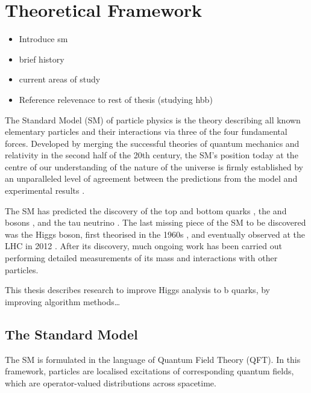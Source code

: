 \chapter{Theoretical Framework}\label{chap:theory}

\begin{itemize}
  \item Introduce sm
  \item brief history
  \item current areas of study
  \item Reference relevenace to rest of thesis (studying hbb)
\end{itemize}

The Standard Model (SM) of particle physics is the theory describing all known elementary particles and their interactions via three of the four fundamental forces.
Developed by merging the successful theories of quantum mechanics and relativity in the second half of the 20th century, the SM's position today at the centre of our understanding of the nature of the universe is firmly established by an unparalleled level of agreement between the predictions from the model and experimental results \cite{morel2020determination,sailer2022measurement}.

The SM has predicted the discovery of the top and bottom quarks \cite{CDF:1995wbb,D0:1995jca,Herb:1977ek}, the \Wboson and \Zboson bosons \cite{UA1:1983crd}, and the tau neutrino \cite{DONUT:2000fbd}.
The last missing piece of the SM to be discovered was the Higgs boson, first theorised in the 1960s \cite{Englert:1964et,Higgs:1964pj,Guralnik:1964eu}, and eventually observed at the LHC in 2012 \cite{HIGG-2012-27,CMS-HIG-12-028}.
After its discovery, much ongoing work has been carried out performing detailed measurements of its mass and interactions with other particles.

This thesis describes research to improve Higgs analysis to b quarks, by improving algorithm methods\dots


\section{The Standard Model}\label{sec:standard_model}

The SM is formulated in the language of Quantum Field Theory (QFT).
In this framework, particles are localised excitations of corresponding quantum fields, which are operator-valued distributions across spacetime.

